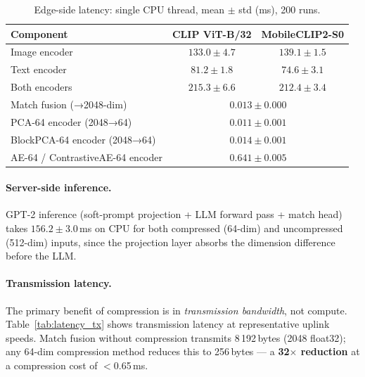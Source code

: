 \documentclass[10pt,twocolumn]{article}
\begin{document}
\begin{table}[h]
\centering
\caption{Edge-side latency: single CPU thread, mean $\pm$ std (ms), 200 runs.}
\label{tab:latency_edge}
\begin{tabular}{lcc}
\toprule
Component & CLIP ViT-B/32 & MobileCLIP2-S0 \\
\midrule
Image encoder     & $133.0 \pm 4.7$  & $\mathbf{139.1 \pm 1.5}$ \\
Text encoder      & $81.2  \pm 1.8$  & $\mathbf{74.6  \pm 3.1}$ \\
Both encoders     & $215.3 \pm 6.6$  & $\mathbf{212.4 \pm 3.4}$ \\
\midrule
Match fusion (→2048-dim)          & \multicolumn{2}{c}{$0.013 \pm 0.000$} \\
\midrule
PCA-64 encoder (2048→64)          & \multicolumn{2}{c}{$0.011 \pm 0.001$} \\
BlockPCA-64 encoder (2048→64)     & \multicolumn{2}{c}{$0.014 \pm 0.001$} \\
AE-64 / ContrastiveAE-64 encoder  & \multicolumn{2}{c}{$0.641 \pm 0.005$} \\
\bottomrule
\end{tabular}
\end{table}

\paragraph{Server-side inference.}
GPT-2 inference (soft-prompt projection + LLM forward pass + match head)
takes $156.2 \pm 3.0$\,ms on CPU for both compressed (64-dim) and
uncompressed (512-dim) inputs, since the projection layer absorbs the
dimension difference before the LLM.

\paragraph{Transmission latency.}
The primary benefit of compression is in \emph{transmission bandwidth}, not compute.
Table~\ref{tab:latency_tx} shows transmission latency at representative
uplink speeds. Match fusion without compression transmits 8\,192\,bytes (2048 float32);
any 64-dim compression method reduces this to 256\,bytes --- a \textbf{32$\times$
reduction} at a compression cost of $<$0.65\,ms.
\end{document}
